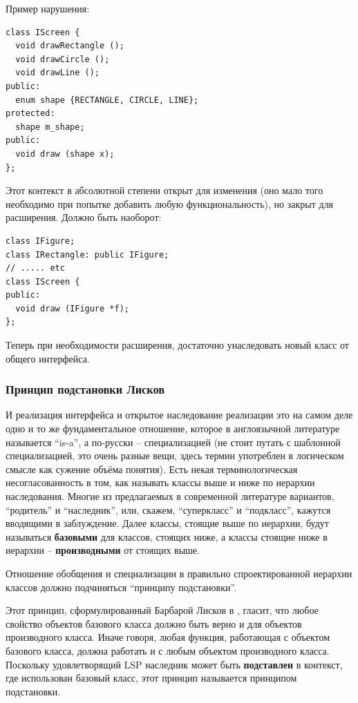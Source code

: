 \documentclass[a4paper,12pt,oneside]{article}
\begin{document}
Пример нарушения:

\begin{lstlisting}
class IScreen {
  void drawRectangle ();
  void drawCircle ();
  void drawLine ();
public:
  enum shape {RECTANGLE, CIRCLE, LINE};
protected:
  shape m_shape;
public:
  void draw (shape x);  
};
\end{lstlisting}

Этот контекст в абсолютной степени открыт для изменения (оно мало того необходимо при попытке добавить любую функциональность), но закрыт для расширения. Должно быть наоборот:

\begin{lstlisting}
class IFigure;
class IRectangle: public IFigure;
// ..... etc
class IScreen {
public:
  void draw (IFigure *f);
};
\end{lstlisting}

Теперь при необходимости расширения, достаточно унаследовать новый класс от общего интерфейса.

\subsubsection{Принцип подстановки Лисков}\label{LSP}

И реализация интерфейса и открытое наследование реализации это на самом деле одно и то же фундаментальное отношение, которое в англоязычной литературе называется ``is-a'', а по-русски -- специализацией (не стоит путать с шаблонной специализацией, это очень разные вещи, здесь термин употреблен в логическом смысле как сужение объёма понятия). Есть некая терминологическая несогласованность в том, как называть классы выше и ниже по иерархии наследования. Многие из предлагаемых в современной литературе вариантов, ``родитель'' и ``наследник'', или, скажем, ``суперкласс'' и ``подкласс'', кажутся вводящими в заблуждение. Далее классы, стоящие выше по иерархии, будут называться \textbf{базовыми} для классов, стоящих ниже, а классы стоящие ниже в иерархии -- \textbf{производными} от стоящих выше.

Отношение обобщения и специализации в правильно спроектированной иерархии классов должно подчиняться ``принципу подстановки''. 

Этот принцип, сформулированный Барбарой Лисков в \cite{LSP}, гласит, что любое свойство объектов базового класса должно быть верно и для объектов производного класса. Иначе говоря, любая функция, работающая с объектом базового класса, должна работать и с любым объектом производного класса. Поскольку удовлетворящий LSP наследник может быть \textbf{подставлен} в контекст, где использован базовый класс, этот принцип называется принципом подстановки.
\end{document}
